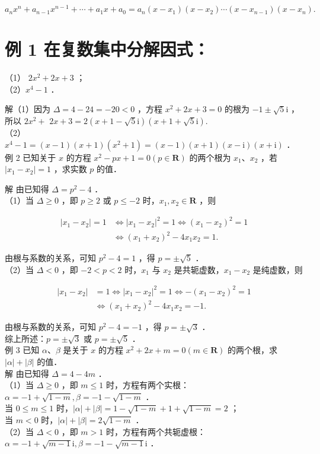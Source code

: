 \documentclass[10pt]{article}
\begin{document}
\[
a_{n} x^{n}+a_{n-1} x^{n-1}+\cdots+a_{1} x+a_{0}=a_{n}\left(x-x_{1}\right)\left(x-x_{2}\right) \cdots\left(x-x_{n-1}\right)\left(x-x_{n}\right) .
\]

\section*{例 1 在复数集中分解因式：}
（1） \(2 x^{2}+2 x+3\) ；\\
（2）\(x^{4}-1\) ．

解（1）因为 \(\Delta=4-24=-20<0\) ，方程 \(x^{2}+2 x+3=0\) 的根为 \(-1 \pm \sqrt{5} \mathrm{i}\) ，所以 \(2 x^{2}+\) \(2 x+3=2(x+1-\sqrt{5} \mathrm{i})(x+1+\sqrt{5} \mathrm{i})\).\\
（2）\(x^{4}-1=(x-1)(x+1)\left(x^{2}+1\right)=(x-1)(x+1)(x-\mathrm{i})(x+\mathrm{i})\) ．\\
例 2 已知关于 \(x\) 的方程 \(x^{2}-p x+1=0(p \in \mathbf{R})\) 的两个根为 \(x_{1} 、 x_{2}\) ，若 \(\left|x_{1}-x_{2}\right|=1\) ，求实数 \(p\) 的值．

解 由已知得 \(\Delta=p^{2}-4\) ．\\
（1）当 \(\Delta \geqslant 0\) ，即 \(p \geqslant 2\) 或 \(p \leqslant-2\) 时，\(x_{1}, x_{2} \in \mathbf{R}\) ，则

\[
\begin{aligned}
\left|x_{1}-x_{2}\right|=1 & \Leftrightarrow\left|x_{1}-x_{2}\right|^{2}=1 \Leftrightarrow\left(x_{1}-x_{2}\right)^{2}=1 \\
& \Leftrightarrow\left(x_{1}+x_{2}\right)^{2}-4 x_{1} x_{2}=1 .
\end{aligned}
\]

由根与系数的关系，可知 \(p^{2}-4=1\) ，得 \(p= \pm \sqrt{5}\) ．\\
（2）当 \(\Delta<0\) ，即 \(-2<p<2\) 时，\(x_{1}\) 与 \(x_{2}\) 是共轭虚数，\(x_{1}-x_{2}\) 是纯虚数，则

\[
\begin{aligned}
\left|x_{1}-x_{2}\right| & =1 \Leftrightarrow\left|x_{1}-x_{2}\right|^{2}=1 \Leftrightarrow-\left(x_{1}-x_{2}\right)^{2}=1 \\
& \Leftrightarrow\left(x_{1}+x_{2}\right)^{2}-4 x_{1} x_{2}=-1 .
\end{aligned}
\]

由根与系数的关系，可知 \(p^{2}-4=-1\) ，得 \(p= \pm \sqrt{3}\) ．\\
综上所述：\(p= \pm \sqrt{3}\) 或 \(p= \pm \sqrt{5}\) ．\\
例 3 已知 \(\alpha 、 \beta\) 是关于 \(x\) 的方程 \(x^{2}+2 x+m=0(m \in \mathbf{R})\) 的两个根，求 \(|\alpha|+|\beta|\) 的值．\\
解 由已知得 \(\Delta=4-4 m\) ．\\
（1）当 \(\Delta \geqslant 0\) ，即 \(m \leqslant 1\) 时，方程有两个实根：\(\alpha=-1+\sqrt{1-m}, \beta=-1-\sqrt{1-m}\) ．\\
当 \(0 \leqslant m \leqslant 1\) 时，\(|\alpha|+|\beta|=1-\sqrt{1-m}+1+\sqrt{1-m}=2\) ；\\
当 \(m<0\) 时，\(|\alpha|+|\beta|=2 \sqrt{1-m}\) ．\\
（2）当 \(\Delta<0\) ，即 \(m>1\) 时，方程有两个共轭虚根：\(\alpha=-1+\sqrt{m-1} \mathrm{i}, \beta=-1-\sqrt{m-1} \mathrm{i}\) ．
\end{document}
